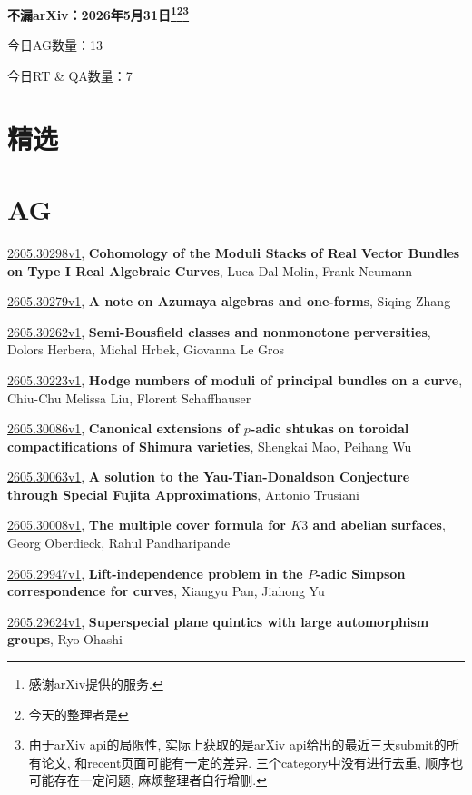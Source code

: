 \documentclass[9pt, a4paper]{article}
\theoremstyle{plain}
\theoremstyle{definition}
\theoremstyle{remark}
\newcommand{\arxiv}[3]{\href{https://arxiv.org/abs/#1}{#1}, \textbf{\textcolor{arxivblue}{#2}}, #3}
\newcommand{\AGnumber}{13}
\newcommand{\RTQAnumber}{7}
\newcommand{\NewestDate}{2026年5月31日}
\newcommand{\todayarXiver}{} %
\begin{document}
\begin{center}
    \Huge\textbf{不漏arXiv：\NewestDate\footnote{感谢arXiv提供的服务.}\footnote{今天的整理者是\todayarXiver}\footnote{由于arXiv api的局限性, 实际上获取的是arXiv api给出的最近三天submit的所有论文, 和recent页面可能有一定的差异. 三个category中没有进行去重, 顺序也可能存在一定问题, 麻烦整理者自行增删.}} \\
\end{center}

\setcounter{section}{-1}

\begin{center}
    今日AG数量：\AGnumber
    
    今日RT \& QA数量：\RTQAnumber
    
\end{center}


\section{精选}


\section{AG}
\arxiv{2605.30298v1}{Cohomology of the Moduli Stacks of Real Vector Bundles on Type I Real Algebraic Curves}{Luca Dal Molin, Frank Neumann}

\arxiv{2605.30279v1}{A note on Azumaya algebras and one-forms}{Siqing Zhang}

\arxiv{2605.30262v1}{Semi-Bousfield classes and nonmonotone perversities}{Dolors Herbera, Michal Hrbek, Giovanna Le Gros}

\arxiv{2605.30223v1}{Hodge numbers of moduli of principal bundles on a curve}{Chiu-Chu Melissa Liu, Florent Schaffhauser}

\arxiv{2605.30086v1}{Canonical extensions of $p$-adic shtukas on toroidal compactifications of Shimura varieties}{Shengkai Mao, Peihang Wu}

\arxiv{2605.30063v1}{A solution to the Yau-Tian-Donaldson Conjecture through Special Fujita Approximations}{Antonio Trusiani}

\arxiv{2605.30008v1}{The multiple cover formula for $K3$ and abelian surfaces}{Georg Oberdieck, Rahul Pandharipande}

\arxiv{2605.29947v1}{Lift-independence problem in the $P$-adic Simpson correspondence for curves}{Xiangyu Pan, Jiahong Yu}

\arxiv{2605.29624v1}{Superspecial plane quintics with large automorphism groups}{Ryo Ohashi}
\end{document}
